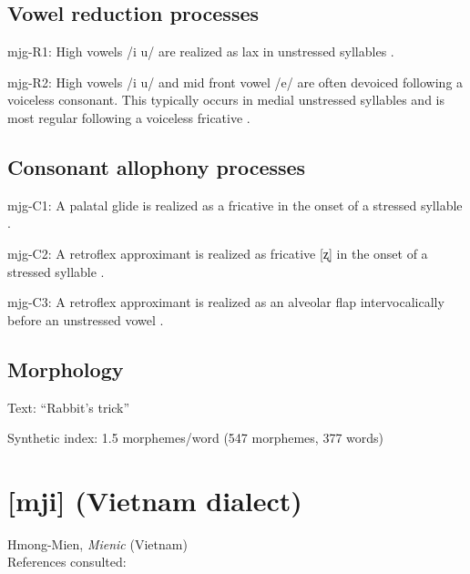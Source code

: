 {\subsection*{Vowel reduction processes}
\begin{appendixdesc}

\item[mjg-R1:] High vowels /i u/ are realized as lax in unstressed syllables \citep[35]{Slater2003}.

\item[mjg-R2:] High vowels /i u/ and mid front vowel /e/ are often devoiced following a voiceless consonant. This typically occurs in medial unstressed syllables and is most regular following a voiceless fricative \citep[36]{Slater2003}.
\end{appendixdesc}
\subsection*{Consonant allophony processes}
\begin{appendixdesc}

\item[mjg-C1:] A palatal glide is realized as a fricative in the onset of a stressed syllable \citep[31--32]{Slater2003}.

\item[mjg-C2:] A retroflex approximant is realized as fricative [ʐ] in the onset of a stressed syllable \citep[30]{Slater2003}.

\item[mjg-C3:] A retroflex approximant is realized as an alveolar flap intervocalically before an unstressed vowel \citep[31]{Slater2003}.
\end{appendixdesc}
\subsection*{Morphology}

\begin{appendixdesc}

\item[Text:] “Rabbit’s trick” \citep[343--350]{Slater2003}

\item[Synthetic index:] 1.5 morphemes/word (547 morphemes, 377 words)
\end{appendixdesc}
\section*{[mji]  (Vietnam dialect)}  %
Hmong-Mien, \textit{Mienic} (Vietnam)\medskip\\
References consulted: \citet{Clark2008}

}
